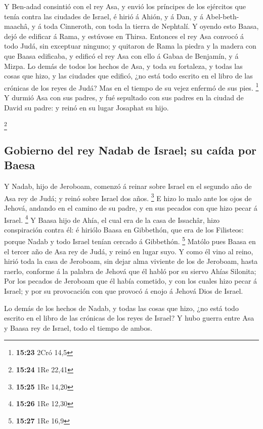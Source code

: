  Y Ben-adad consintió con el rey Asa, y envió los
príncipes de los ejércitos que tenía contra las ciudades de Israel, é
hirió á Ahión, y á Dan, y á Abel-beth-maachâ, y á toda Cinneroth, con
toda la tierra de Nephtalí.  Y oyendo esto Baasa, dejó de
edificar á Rama, y estúvose en Thirsa.  Entonces el rey
Asa convocó á todo Judá, sin exceptuar ninguno; y quitaron de Rama la
piedra y la madera con que Baasa edificaba, y edificó el rey Asa con
ello á Gabaa de Benjamín, y á Mizpa.  Lo demás de todos
los hechos de Asa, y toda su fortaleza, y todas las cosas que hizo, y
las ciudades que edificó, ¿no está todo escrito en el libro de las
crónicas de los reyes de Judá? Mas en el tiempo de su vejez enfermó de
sus pies. \footnote{\textbf{15:23} 2Cró 14,5}  Y durmió
Asa con sus padres, y fué sepultado con sus padres en la ciudad de David
su padre: y reinó en su lugar Josaphat su hijo.

\footnote{\textbf{15:24} 1Re 22,41}

\hypertarget{gobierno-del-rey-nadab-de-israel-su-cauxedda-por-baesa}{%
\subsection{Gobierno del rey Nadab de Israel; su caída por
Baesa}\label{gobierno-del-rey-nadab-de-israel-su-cauxedda-por-baesa}}

 Y Nadab, hijo de Jeroboam, comenzó á reinar sobre Israel
en el segundo año de Asa rey de Judá; y reinó sobre Israel dos años.
\footnote{\textbf{15:25} 1Re 14,20}  E hizo lo malo ante
los ojos de Jehová, andando en el camino de su padre, y en sus pecados
con que hizo pecar á Israel. \footnote{\textbf{15:26} 1Re 12,30}
 Y Baasa hijo de Ahía, el cual era de la casa de
Issachâr, hizo conspiración contra él: é hiriólo Baasa en Gibbethón, que
era de los Filisteos: porque Nadab y todo Israel tenían cercado á
Gibbethón. \footnote{\textbf{15:27} 1Re 16,9}  Matólo
pues Baasa en el tercer año de Asa rey de Judá, y reinó en lugar suyo.
 Y como él vino al reino, hirió toda la casa de Jeroboam,
sin dejar alma viviente de los de Jeroboam, hasta raerlo, conforme á la
palabra de Jehová que él habló por su siervo Ahías Silonita;
 Por los pecados de Jeroboam que él había cometido, y con
los cuales hizo pecar á Israel; y por su provocación con que provocó á
enojo á Jehová Dios de Israel.

 Lo demás de los hechos de Nadab, y todas las cosas que
hizo, ¿no está todo escrito en el libro de las crónicas de los reyes de
Israel?  Y hubo guerra entre Asa y Baasa rey de Israel,
todo el tiempo de ambos.

